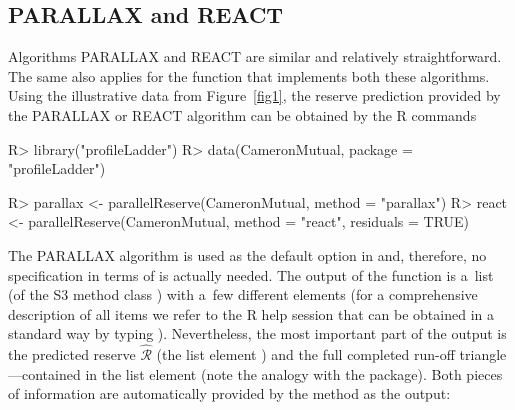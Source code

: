 \subsection{PARALLAX and REACT}
\label{R_parallaxreact}
Algorithms PARALLAX and REACT are similar and relatively straightforward. The same also applies for the  function that implements both these algorithms. Using the illustrative data from Figure~\ref{fig1}, the reserve prediction provided by the PARALLAX or REACT algorithm can be obtained by the R commands
\begin{example}
    R> library("profileLadder")
    R> data(CameronMutual, package = "profileLadder")

    R> parallax <- parallelReserve(CameronMutual, method = "parallax")
    R> react <- parallelReserve(CameronMutual, method = "react", residuals = TRUE)
\end{example}
The PARALLAX algorithm is used as the default option in  and, therefore, no specification in terms of  is actually needed. The output of the  function is a~list (of the {S3} method class ) with a~few different  elements (for a comprehensive description of all items we  refer to the R help session that can be obtained in a standard way by typing ). Nevertheless, the most important part of the output is the predicted reserve $\widehat{\mathcal{R}}$ (the list element ) and the full completed run-off triangle---contained in the list element  (note the analogy with the  package). Both pieces of information are automatically provided  by the  method as the output:
